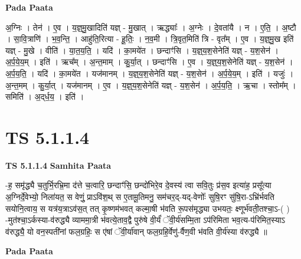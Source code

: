 \documentclass[17pt]{extarticle}
\begin{document}
\textbf{Pada Paata} \newline

अ॒ग्निः । तेन॑ । ए॒व । य॒ज्ञ्॒मु॒खादिति॑ यज्ञ् - मु॒खात् । ऋद्ध्याः᳚ । अ॒ग्नेः । दे॒वता॑यै । न । ए॒ति॒ । अ॒ष्टौ । सा॒वि॒त्राणि॑ । भ॒व॒न्ति॒ । आहु॑ति॒रित्या - हू॒तिः॒ । न॒व॒मी । त्रि॒वृत॒मिति॑ त्रि - वृत᳚म् । ए॒व । य॒ज्ञ्॒मु॒ख इति॑ यज्ञ् - मु॒खे । वीति॑ । या॒त॒य॒ति॒ । यदि॑ । का॒मये॑त । छन्दाꣳ॑सि । य॒ज्ञ्॒य॒श॒सेनेति॑ यज्ञ् - य॒श॒सेन॑ । अ॒र्प॒ये॒य॒म् । इति॑ । ऋच᳚म् । अ॒न्त॒माम् । कु॒र्या॒त् । छन्दाꣳ॑सि । ए॒व । य॒ज्ञ्॒य॒श॒सेनेति॑ यज्ञ् - य॒श॒सेन॑ । अ॒र्प॒य॒ति॒ । यदि॑ । का॒मये॑त । यज॑मानम् । य॒ज्ञ्॒य॒श॒सेनेति॑ यज्ञ् - य॒श॒सेन॑ । अ॒र्प॒ये॒य॒म् । इति॑ । यजुः॑ । अ॒न्त॒मम् । कु॒र्या॒त् । यज॑मानम् । ए॒व । य॒ज्ञ्॒य॒श॒सेनेति॑ यज्ञ् - य॒श॒सेन॑ । अ॒र्प॒य॒ति॒ । ऋ॒चा । स्तोम᳚म् । समिति॑ । अ॒द्‌र्ध॒य॒ । इति॑ ।  \newline




\section*{ TS 5.1.1.4 }

\textbf{TS 5.1.1.4 } \newline
\textbf{Samhita Paata} \newline

-ह॒ समृ॑द्ध्यै च॒तुर्भि॒रभ्रि॒मा द॑त्ते च॒त्वारि॒ छन्दाꣳ॑सि॒ छन्दो॑भिरे॒व दे॒वस्य॑ त्वा सवि॒तुः प्र॑स॒व इत्या॑ह॒ प्रसू᳚त्या अ॒ग्निर्दे॒वेभ्यो॒ निला॑यत॒ स वेणुं॒ प्राऽवि॑श॒थ् स ए॒तामू॒तिमनु॒ सम॑चर॒द्-यद्-वेणोः᳚ सुषि॒रꣳ सु॑षि॒रा-ऽभ्रि॑र्भवति सयोनि॒त्वाय॒ स यत्र॑य॒त्राऽव॑स॒त् तत् कृ॒ष्णम॑भवत् कल्मा॒षी भ॑वति रू॒पस॑मृद्ध्या उभयतः॒ क्ष्णूर्भ॑वती॒तश्चा॒ऽ-( ) -मुत॑श्चा॒ऽर्कस्या-व॑रुद्ध्यै व्याममा॒त्री भ॑वत्ये॒ताव॒द्वै पुरु॑षे वी॒र्यं॑ ॅवी॒र्य॑सम्मि॒ता ऽप॑रिमिता भव॒त्य-प॑रिमित॒स्याऽ व॑रुद्ध्यै॒ यो वन॒स्पती॑नां फल॒ग्रहिः॒ स ए॑षां ॅवी॒र्या॑वान् फल॒ग्रहि॒र्वेणु॑-र्वैण॒वी भ॑वति वी॒र्य॑स्या व॑रुद्ध्यै ॥ \newline

\textbf{Pada Paata} \newline
\end{document}
